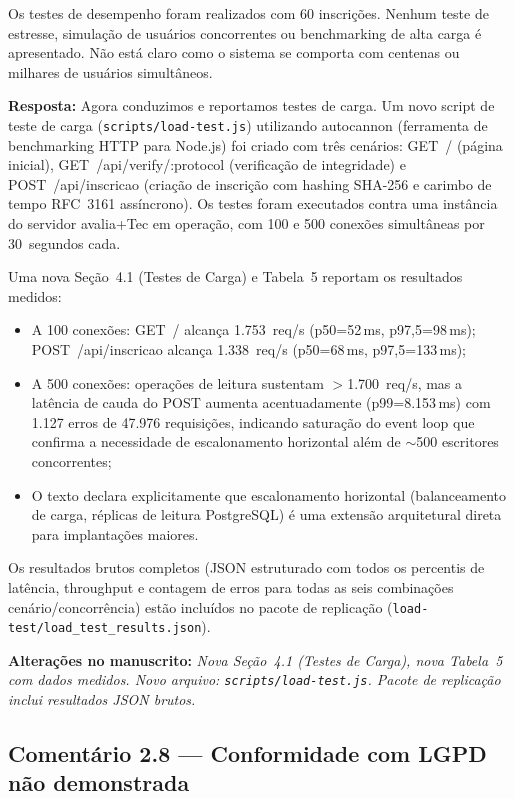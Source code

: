 \documentclass[11pt,a4paper]{article}
\newcommand{\response}[1]{\par\noindent\textcolor{responsecolor}{\textbf{Resposta:}} #1}
\newcommand{\change}[1]{\par\noindent\textcolor{changecolor}{\textbf{Alterações no manuscrito:}} \textit{#1}}
\begin{document}
\begin{reviewerbox}
Os testes de desempenho foram realizados com 60 inscrições. Nenhum teste de estresse, simulação de usuários concorrentes ou benchmarking de alta carga é apresentado. Não está claro como o sistema se comporta com centenas ou milhares de usuários simultâneos.
\end{reviewerbox}

\response{Agora conduzimos e reportamos testes de carga. Um novo script de teste de carga (\texttt{scripts/load-test.js}) utilizando autocannon (ferramenta de benchmarking HTTP para Node.js) foi criado com três cenários: GET~/ (página inicial), GET~/api/verify/:protocol (verificação de integridade) e POST~/api/inscricao (criação de inscrição com hashing SHA-256 e carimbo de tempo RFC~3161 assíncrono). Os testes foram executados contra uma instância do servidor avalia+Tec em operação, com 100 e 500 conexões simultâneas por 30~segundos cada.}

Uma nova Seção~4.1 (Testes de Carga) e Tabela~5 reportam os resultados medidos:
\begin{itemize}[nosep]
  \item A 100 conexões: GET~/ alcança 1.753~req/s (p50=52\,ms, p97,5=98\,ms); POST~/api/inscricao alcança 1.338~req/s (p50=68\,ms, p97,5=133\,ms);
  \item A 500 conexões: operações de leitura sustentam $>$1.700~req/s, mas a latência de cauda do POST aumenta acentuadamente (p99=8.153\,ms) com 1.127 erros de 47.976 requisições, indicando saturação do event loop que confirma a necessidade de escalonamento horizontal além de $\sim$500 escritores concorrentes;
  \item O texto declara explicitamente que escalonamento horizontal (balanceamento de carga, réplicas de leitura PostgreSQL) é uma extensão arquitetural direta para implantações maiores.
\end{itemize}

Os resultados brutos completos (JSON estruturado com todos os percentis de latência, throughput e contagem de erros para todas as seis combinações cenário/concorrência) estão incluídos no pacote de replicação (\texttt{load-test/load\_test\_results.json}).

\change{Nova Seção~4.1 (Testes de Carga), nova Tabela~5 com dados medidos. Novo arquivo: \texttt{scripts/load-test.js}. Pacote de replicação inclui resultados JSON brutos.}

\bigskip

\subsection*{Comentário 2.8 --- Conformidade com LGPD não demonstrada}
\end{document}
